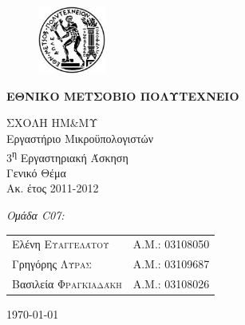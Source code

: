 \begin{titlepage}
\begin{center}
\begin{figure}[h] 
     \includegraphics[width=0.2\textwidth]{title/ntua_logo}
\end{figure}
\vspace{1cm}
\begin{LARGE}\textbf{ΕΘΝΙΚΟ ΜΕΤΣΟΒΙΟ ΠΟΛΥΤΕΧΝΕΙΟ\\[1.5cm]}\end{LARGE}
\begin{Large}
ΣΧΟΛΗ ΗΜ\&ΜΥ\\
Εργαστήριο Μικροϋπολογιστών\\[2cm]
3\textsuperscript{η} Εργαστηριακή Άσκηση\\[0.5cm]
\LARGE{Γενικό Θέμα}\\[0.5cm]
\large{Ακ. έτος 2011-2012}\\
\end{Large}
\vfill
\begin{flushright}
\Large \textit{Ομάδα C07:}\\[1cm]
\begin{tabular}{l r}
{Ελένη \textsc{Ευαγγελάτου}}&
{Α.Μ.: 03108050}\\
{Γρηγόρης \textsc{Λύρας}}&
{Α.Μ.: 03109687}\\
{Βασιλεία \textsc{Φραγκιαδάκη}}&
{Α.Μ.: 03108026}\\
\end{tabular}
\end{flushright}

\large\today\\
\end{center}
\end{titlepage}


